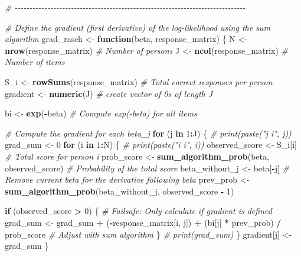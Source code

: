 \documentclass[
]{article}
\newenvironment{Shaded}{\begin{snugshade}}{\end{snugshade}}
\newcommand{\CommentTok}[1]{\textcolor[rgb]{0.56,0.35,0.01}{\textit{#1}}}
\newcommand{\ControlFlowTok}[1]{\textcolor[rgb]{0.13,0.29,0.53}{\textbf{#1}}}
\newcommand{\DecValTok}[1]{\textcolor[rgb]{0.00,0.00,0.81}{#1}}
\newcommand{\FunctionTok}[1]{\textcolor[rgb]{0.13,0.29,0.53}{\textbf{#1}}}
\newcommand{\NormalTok}[1]{#1}
\newcommand{\OtherTok}[1]{\textcolor[rgb]{0.56,0.35,0.01}{#1}}
\newcommand{\SpecialCharTok}[1]{\textcolor[rgb]{0.81,0.36,0.00}{\textbf{#1}}}
\begin{document}
\begin{Shaded}
\begin{Highlighting}[]
\CommentTok{\# {-}{-}{-}{-}{-}{-}{-}{-}{-}{-}{-}{-}{-}{-}{-}{-}{-}{-}{-}{-}{-}{-}{-}{-}{-}{-}{-}{-}{-}{-}{-}{-}{-}{-}{-}{-}{-}{-}{-}{-}{-}{-}{-}{-}{-}{-}{-}{-}{-}{-}{-}{-}{-}{-}{-}{-}{-}{-}{-}{-}{-}{-}{-}{-}{-}{-}{-}{-}{-}{-}{-}{-}{-}{-}{-}{-}{-}{-}}

\CommentTok{\# Define the gradient (first derivative) of the log{-}likelihood using the sum algorithm}
\NormalTok{grad\_rasch }\OtherTok{\textless{}{-}} \ControlFlowTok{function}\NormalTok{(beta, response\_matrix) \{}
\NormalTok{  N }\OtherTok{\textless{}{-}} \FunctionTok{nrow}\NormalTok{(response\_matrix) }\CommentTok{\# Number of persons}
\NormalTok{  J }\OtherTok{\textless{}{-}} \FunctionTok{ncol}\NormalTok{(response\_matrix) }\CommentTok{\# Number of items}
  
\NormalTok{  S\_i }\OtherTok{\textless{}{-}} \FunctionTok{rowSums}\NormalTok{(response\_matrix)  }\CommentTok{\# Total correct responses per person}
\NormalTok{  gradient }\OtherTok{\textless{}{-}} \FunctionTok{numeric}\NormalTok{(J) }\CommentTok{\# create vector of 0s of length J }
  
\NormalTok{  bi }\OtherTok{\textless{}{-}} \FunctionTok{exp}\NormalTok{(}\SpecialCharTok{{-}}\NormalTok{beta)  }\CommentTok{\# Compute exp({-}beta) for all items}
  
  \CommentTok{\# Compute the gradient for each beta\_j}
  \ControlFlowTok{for}\NormalTok{ (j }\ControlFlowTok{in} \DecValTok{1}\SpecialCharTok{:}\NormalTok{J) \{}
    \CommentTok{\# print(paste("j i", j))}
\NormalTok{    grad\_sum }\OtherTok{\textless{}{-}} \DecValTok{0} 
    \ControlFlowTok{for}\NormalTok{ (i }\ControlFlowTok{in} \DecValTok{1}\SpecialCharTok{:}\NormalTok{N) \{}
          \CommentTok{\# print(paste("i i", i))}
\NormalTok{      observed\_score }\OtherTok{\textless{}{-}}\NormalTok{ S\_i[i]  }\CommentTok{\# Total score for person i}
\NormalTok{      prob\_score }\OtherTok{\textless{}{-}} \FunctionTok{sum\_algorithm\_prob}\NormalTok{(beta, observed\_score)  }\CommentTok{\# Probability of the total score}
\NormalTok{      beta\_without\_j }\OtherTok{\textless{}{-}}\NormalTok{ beta[}\SpecialCharTok{{-}}\NormalTok{j] }\CommentTok{\# Remove current beta for the derivative following beta}
\NormalTok{      prev\_prob }\OtherTok{\textless{}{-}} \FunctionTok{sum\_algorithm\_prob}\NormalTok{(beta\_without\_j, observed\_score }\SpecialCharTok{{-}} \DecValTok{1}\NormalTok{)}
      
      \ControlFlowTok{if}\NormalTok{ (observed\_score }\SpecialCharTok{\textgreater{}} \DecValTok{0}\NormalTok{) \{  }\CommentTok{\# Failsafe: Only calculate if gradient is defined}
\NormalTok{        grad\_sum }\OtherTok{\textless{}{-}}\NormalTok{ grad\_sum }\SpecialCharTok{+}\NormalTok{ (}\SpecialCharTok{{-}}\NormalTok{response\_matrix[i, j]) }\SpecialCharTok{+}\NormalTok{ (bi[j] }\SpecialCharTok{*}\NormalTok{ prev\_prob) }\SpecialCharTok{/}\NormalTok{ prob\_score  }\CommentTok{\# Adjust with sum algorithm}
\NormalTok{      \}}
      \CommentTok{\# print(grad\_sum)}
\NormalTok{    \}}
\NormalTok{    gradient[j] }\OtherTok{\textless{}{-}}\NormalTok{ grad\_sum}
\NormalTok{  \}}
  

\end{Highlighting}
\end{Shaded}
\end{document}
